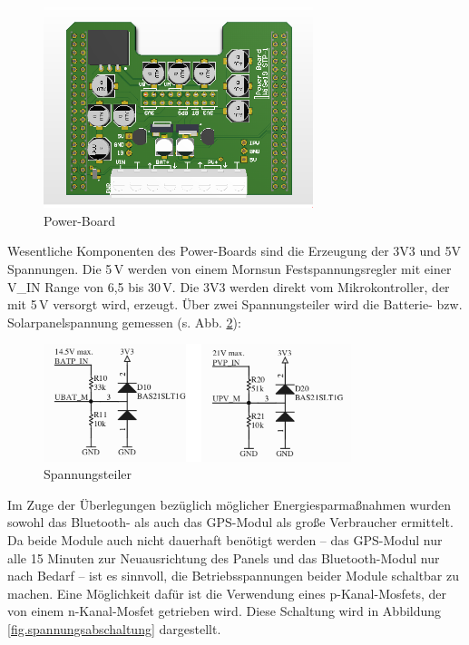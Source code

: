 \begin{figure}[H]
  \centering
  \includegraphics[width=0.7\textwidth]{./img/PCB_Power_3D_top.png}
  \caption{Power-Board}\label{fig.powerboard}
\end{figure}

Wesentliche Komponenten des Power-Boards sind die Erzeugung der 3V3 und 5V Spannungen. Die 5\,V werden von einem Mornsun Festspannungsregler mit einer V\_IN Range von 6,5 bis 30\,V.
Die 3V3 werden direkt vom Mikrokontroller, der mit 5\,V versorgt wird, erzeugt. Über zwei Spannungsteiler wird die Batterie- bzw. Solarpanelspannung gemessen (s. Abb. \ref{fig.spannungsteiler}):

\begin{figure}[H]
  \centering
  \includegraphics[width=0.8\textwidth]{./img/spannungsteiler.png}
  \caption{Spannungsteiler}\label{fig.spannungsteiler}
\end{figure}

Im Zuge der Überlegungen bezüglich möglicher Energiesparmaßnahmen wurden sowohl das Bluetooth- als auch das GPS-Modul als große Verbraucher ermittelt. Da beide Module auch nicht dauerhaft benötigt werden -- das GPS-Modul nur alle 15 Minuten zur Neuausrichtung des Panels und das Bluetooth-Modul nur nach Bedarf -- ist es sinnvoll, die Betriebsspannungen beider Module schaltbar zu machen. Eine Möglichkeit dafür ist die Verwendung eines p-Kanal-Mosfets, der von einem n-Kanal-Mosfet getrieben wird. Diese Schaltung wird in Abbildung \ref{fig.spannungsabschaltung} dargestellt.

